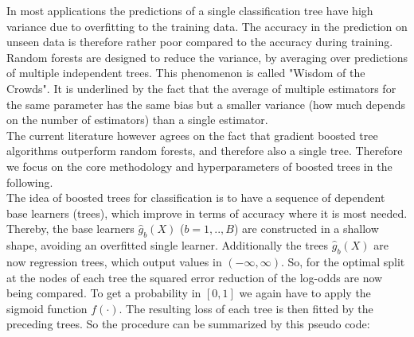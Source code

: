 \documentclass[12pt,titlepage]{article}
\begin{document}
In most applications the predictions of a single classification tree have high variance due to overfitting to the training data. The accuracy in the prediction on unseen data is therefore rather poor compared to the accuracy during training. Random forests \cite{randomforest} are designed to reduce the variance, by averaging over predictions of multiple independent trees. This phenomenon is called "Wisdom of the Crowds". It is underlined by the fact that the average of multiple estimators for the same parameter has the same bias but a smaller variance (how much depends on the number of estimators) than a single estimator. \\
The current literature however agrees on the fact that gradient boosted tree algorithms outperform random forests, and therefore also a single tree. Therefore we focus on the core methodology and hyperparameters of boosted trees in the following. \\
The idea of boosted trees for classification is to have a sequence of dependent base learners (trees), which improve in terms of accuracy where it is most needed. Thereby, the base learners $\hat{g}_{b}(X)$ ($b=1,..,B$) are constructed in a shallow shape, avoiding an overfitted single learner. Additionally the trees $\hat{g}_{b}(X)$ are now regression trees, which output values in $(-\infty, \infty)$. So, for the optimal split at the nodes of each tree the squared error reduction of the log-odds are now being compared. To get a probability in $[0, 1]$ we again have to apply the sigmoid function $f(\cdot)$. The resulting loss of each tree is then fitted by the preceding trees. So the procedure can be summarized by this pseudo code: \\
\end{document}
